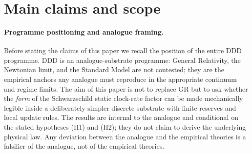 \documentclass[11pt,a4paper]{article}
\begin{document}
\noindent{}
\bigskip


\section{Main claims and scope}
\label{sec:claims}

\paragraph{Programme positioning and analogue framing.}
Before stating the claims of this paper we recall the position
of the entire DDD programme. DDD is an analogue-substrate
programme: General Relativity, the Newtonian limit, and the
Standard Model are not contested; they are the empirical
anchors any analogue must reproduce in the appropriate
continuum and regime limits. The aim of this paper is not to
replace GR but to ask whether the \emph{form} of the
Schwarzschild static clock-rate factor can be made mechanically
legible inside a deliberately simpler discrete substrate with
finite reserves and local update rules. The results are
internal to the analogue and conditional on the stated
hypotheses (H1) and (H2); they do not claim to derive the
underlying physical law. Any deviation between the analogue
and the empirical theories is a falsifier of the analogue, not
of the empirical theories.
\end{document}

